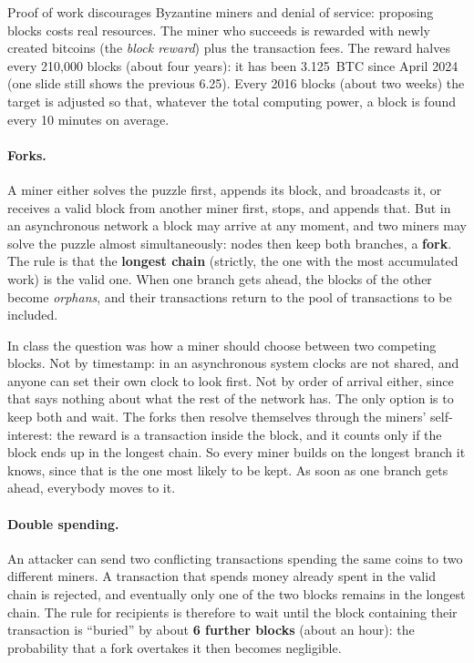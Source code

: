 Proof of work discourages Byzantine miners and denial of service: proposing blocks costs real resources. The miner who succeeds is rewarded with newly created bitcoins (the \emph{block reward}) plus the transaction fees. The reward halves every 210{,}000 blocks (about four years): it has been 3.125~BTC since April 2024 (one slide still shows the previous 6.25). Every 2016 blocks (about two weeks) the target is adjusted so that, whatever the total computing power, a block is found every 10 minutes on average.

\paragraph{Forks.} A miner either solves the puzzle first, appends its block, and broadcasts it, or receives a valid block from another miner first, stops, and appends that. But in an asynchronous network a block may arrive at any moment, and two miners may solve the puzzle almost simultaneously: nodes then keep both branches, a \textbf{fork}. The rule is that the \textbf{longest chain} (strictly, the one with the most accumulated work) is the valid one. When one branch gets ahead, the blocks of the other become \emph{orphans}, and their transactions return to the pool of transactions to be included.

In class the question was how a miner should choose between two competing blocks. Not by timestamp: in an asynchronous system clocks are not shared, and anyone can set their own clock to look first. Not by order of arrival either, since that says nothing about what the rest of the network has. The only option is to keep both and wait. The forks then resolve themselves through the miners' self-interest: the reward is a transaction inside the block, and it counts only if the block ends up in the longest chain. So every miner builds on the longest branch it knows, since that is the one most likely to be kept. As soon as one branch gets ahead, everybody moves to it.

\paragraph{Double spending.} An attacker can send two conflicting transactions spending the same coins to two different miners. A transaction that spends money already spent in the valid chain is rejected, and eventually only one of the two blocks remains in the longest chain. The rule for recipients is therefore to wait until the block containing their transaction is \enquote{buried} by about \textbf{6 further blocks} (about an hour): the probability that a fork overtakes it then becomes negligible.


